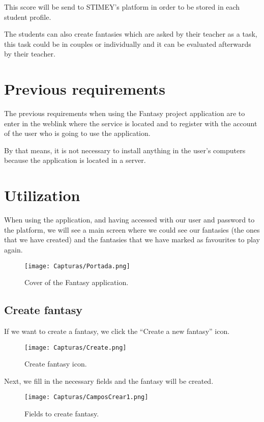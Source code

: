 \documentclass{book}
\begin{document}
This score will be send to STIMEY's platform in order to be stored in each student profile.

The students can also create fantasies which are asked by their teacher as a task, this task could be in couples or individually and it can be evaluated afterwards by their teacher.


\section{Previous requirements}
The previous requirements when using the Fantasy project application are to enter in the weblink where the service is located and to register with the account of the user who is going to use the application.

By that means, it is not necessary to install anything in the user's computers because the application is located in a server.


\section{Utilization}
When using the application, and having accessed with our user and password to the platform, we will see a main screen where we could see our fantasies (the ones that we have created) and the fantasies that we have marked as favourites to play again.

\newpage
\begin{figure}[h]
	\centering
	\texttt{[image: Capturas/Portada.png]}
	\caption{Cover of the Fantasy application.}
	\label{Cover of the Fantasy application}
\end{figure}

\subsection{Create fantasy}
If we want to create a fantasy, we click the ``Create a new fantasy'' icon.

\begin{figure}[h]
	\centering
	\texttt{[image: Capturas/Create.png]}
	\caption{Create fantasy icon.}
	\label{Create fantasy icon}
\end{figure}

Next, we fill in the necessary fields and the fantasy will be created.

\newpage
\begin{figure}[h]
	\centering
	\texttt{[image: Capturas/CamposCrear1.png]}
	\caption{Fields to create fantasy.}
	\label{Fields to create fantasy1}
\end{figure}
\end{document}
